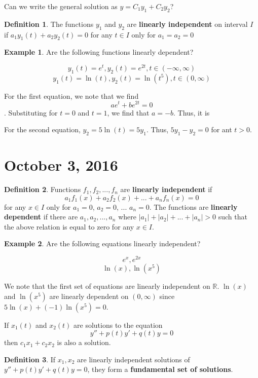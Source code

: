 \documentclass[11pt]{article}
\theoremstyle{plain} %
\theoremstyle{definition}
\newtheorem*{definition}{Definition} %
\theoremstyle{example}
\newtheorem*{example}{Example}
\theoremstyle{remark}
\begin{document}
Can we write the general solution as $y = C_1y_1 + C_2y_2$?

\begin{definition}
The functions $y_1$ and $y_2$ are \textbf{linearly independent} on interval $I$ if $a_1y_1(t) + a_2y_2(t) = 0$ for any $t \in I$ only for $a_1=a_2=0$
\end{definition}

\begin{example}
Are the following functions linearly dependent?

$$y_1(t) =e^t, y_2(t) = e^{2t}, t\in (-\infty, \infty)$$
$$y_1(t) = \ln(t), y_2(t) = \ln\left(t^5\right), t \in (0, \infty)$$
\end{example}

For the first equation, we note that we find $$ae^t + be^{2t} = 0$$. Substituting for $t=0$ and $t=1$, we find that $a=-b$. Thus, it is 

For the second equation, $y_2=5\ln(t) = 5y_1$. Thus, $5y_1-y_2=0$ for ant $t>0$.




\section{October 3, 2016}
\begin{definition} Functions $f_1, f_2, ..., f_n$ are \textbf{linearly independent} if $$a_1f_1(x) + a_2f_2(x) + ... + a_nf_n(x) = 0$$ for any $x \in I$ only for $a_1 = 0$, $a_2 = 0$, ... $a_n = 0$. The functions are \textbf{linearly dependent} if there are $a_1, a_2, ..., a_n$ where $|a_1| + |a_2| + ... + |a_n| > 0$ such that the above relation is equal to zero for any $x \in I$. 
\end{definition}




\begin{example}
Are the following equations linearly independent?

$$e^x, e^{2x}$$ 
$$\ln(x), \ln\left(x^5\right)$$
\end{example}

We note that the first set of equations are linearly independent on $\mathbb R$. $\ln(x)$ and $\ln\left(x^5\right)$ are linearly dependent on $(0,\infty)$ since $5\ln(x) +(-1)\ln\left(x^5\right) = 0.$


If $x_1(t)$ and $x_2(t)$ are solutions to the equation
$$y'' + p(t) y' + q(t)y = 0$$
then $c_1x_1 + c_2x_2$ is also a solution.  

\begin{definition}
If $x_1, x_2$ are linearly independent solutions of $y'' + p(t) y' + q(t) y = 0$, they form a \textbf{fundamental set of solutions}.
\end{definition}
\end{document}

